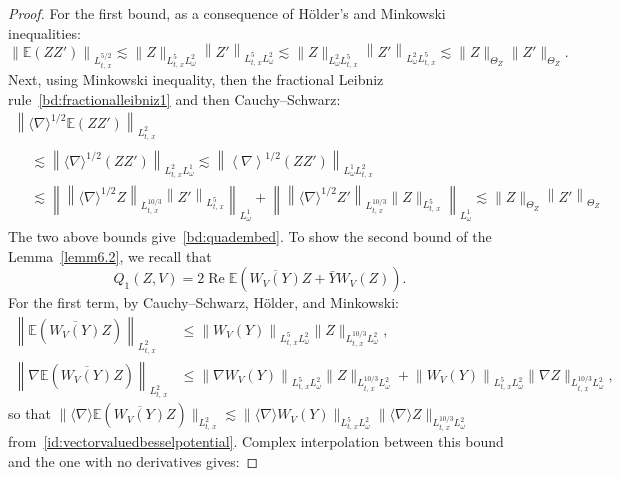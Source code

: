 \documentclass[10pt]{amsart}
\theoremstyle{definition}\newtheorem{defi}[theo]{Definition}\newtheorem{rema}[theo]{Remark}\newtheorem{exam}[theo]{Example}\newtheorem{exem}[theo]{Example}\newtheorem{nota}[theo]{Notation}
\newcommand{\E}{\mathbb{E}}
\DeclareMathOperator{\Rel}{Re}
\begin{document}
\begin{proof}
For the first bound, as a consequence of H\"older's and Minkowski inequalities:
\[
\left\| \E (ZZ')\right\|_{L^{5/2}_{t,\,x}}\lesssim \| Z\|_{L^5_{t,\,x}L^2_\omega}\left\| Z'\right\|_{L^5_{t,\,x}L^2_\omega}\lesssim \| Z\|_{L^2_\omega L^5_{t,\,x}}\left\| Z'\right\|_{L^2_\omega L^5_{t,\,x}} \lesssim \| Z\|_{\Theta_Z}\| Z'\|_{\Theta_Z}.
\]
Next, using Minkowski inequality, then the fractional Leibniz rule~\eqref{bd:fractionalleibniz1} and then Cauchy--Schwarz:
\begin{multline*}
\left\| \langle \nabla \rangle^{1/2} \E \left(ZZ'\right)\right\|_{L^{2}_{t,\,x}}\\
\begin{aligned}
&\lesssim \left\| \langle \nabla \rangle^{1/2} \left(ZZ'\right)\right\|_{L^{2}_{t,\,x}L^1_\omega}\lesssim \left\| \left\langle \nabla \right\rangle^{1/2} \left(ZZ'\right)\right\|_{L^1_\omega L^{2}_{t,\,x}} \\
&\lesssim \left\| \left\| \langle \nabla \rangle^{1/2} Z \right\|_{L^{10/3}_{t,\,x}} \left\| Z' \right\|_{L^{5}_{t,\,x}}\right\|_{L^1_\omega}+\left\| \left\| \langle \nabla \rangle^{1/2} Z' \right\|_{L^{10/3}_{t,\,x}} \| Z \|_{L^{5}_{t,\,x}}\right\|_{L^1_\omega} \lesssim \| Z \|_{\Theta_Z} \left\| Z'\right\|_{\Theta_Z}
\end{aligned}
\end{multline*}
The two above bounds give~\eqref{bd:quadembed}. To show the second bound of the Lemma~\ref{lemm6.2}, we recall that
\begin{equation} \label{def:Q1inter}
Q_1(Z,V)= 2\Rel \E\left(\overline{W_V(Y)} Z + \bar Y W_V(Z)\right).
\end{equation} 
For the first term, by Cauchy--Schwarz, H\"older, and Minkowski:
\begin{align*}
\left\| \E \left(\overline{W_V(Y)} Z\right) \right\|_{L^2_{t,\,x}} &\leq \left\|W_V(Y)\right\|_{L^5_{t,\,x} L^2_\omega} \|Z\|_{L^{10/3}_{t,\,x} L^2_\omega},
\\
\left\| \nabla \E \left(\overline{W_V(Y)} Z\right) \right\|_{L^2_{t,\,x}} &\leq \left\| \nabla W_V(Y)\right\|_{L^5_{t,\,x} L^2_\omega} \|Z\|_{L^{10/3}_{t,\,x} L^2_\omega} + \left\| W_V(Y)\right\|_{L^5_{t,\,x} L^2_\omega} \| \nabla Z\|_{L^{10/3}_{t,\,x} L^2_\omega},
\end{align*}
so that $\| \langle \nabla \rangle \E (\overline{W_V(Y)} Z)\|_{L^2_{t,\,x}}\lesssim \| \langle \nabla \rangle W_V(Y) \|_{L^5_{t,\,x} L^2_\omega}\| \langle \nabla \rangle Z \|_{L^{10/3}_{t,\,x} L^2_\omega}$ from~\eqref{id:vectorvaluedbesselpotential}. Complex interpolation between this bound and the one with no derivatives gives:

\end{proof}
\end{document}
